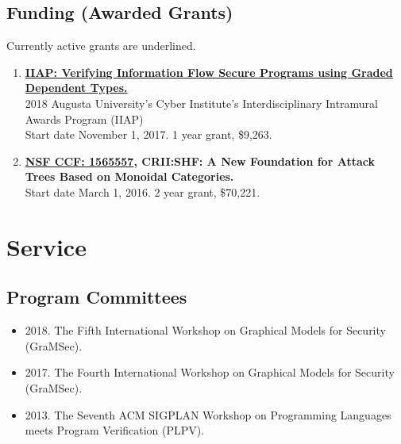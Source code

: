 \documentclass{article}
\begin{document}
    \subsection{Funding (Awarded Grants)}
    \label{subsec:funding_(awarded_grants)}
    Currently active grants are underlined.

    \begin{enumerate}
    \item \textbf{\underline{IIAP: Verifying Information Flow Secure Programs using Graded Dependent Types.}}\\
      2018 Augusta University's Cyber Institute's Interdisciplinary Intramural Awards Program (IIAP)\\
      Start date November 1, 2017. 1 year grant, \$9,263.
    \item \textbf{\underline{NSF CCF: 1565557}, CRII:SHF: A New Foundation for Attack Trees Based on Monoidal Categories.}\\
      Start date March 1, 2016. 2 year grant, \$70,221.      
    \end{enumerate}
   
  \section{Service}
  \label{sec:service}
  \subsection{Program Committees}
  \label{subsec:program_committees}
  \begin{itemize}
  \item[] 2018. The Fifth International Workshop on Graphical Models for Security (GraMSec).
  \item[] 2017. The Fourth International Workshop on Graphical Models for Security (GraMSec).
  \item[] 2013. The Seventh ACM SIGPLAN Workshop on Programming Languages meets Program Verification (PLPV).
  \end{itemize}
  
\end{document}
